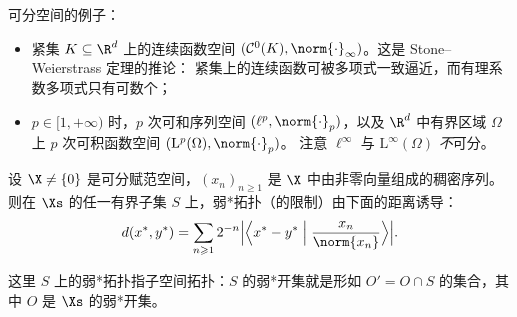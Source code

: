 \begin{example}
\label{exa:29}
可分空间的例子：
\begin{itemize}
  \item 紧集 $K\subseteq\R^d$ 上的连续函数空间 $(\mathcal{C}^0(K),\norm{\cdot}_\infty)$。这是 Stone--Weierstrass 定理的推论：
  紧集上的连续函数可被多项式一致逼近，而有理系数多项式只有可数个；
  \item $p\in[1,+\infty)$ 时，$p$ 次可和序列空间 $(\ell^p,\norm{\cdot}_p)$，以及 $\R^d$ 中有界区域 $\Omega$ 上 $p$ 次可积函数空间 $(\mathrm{L}^p(\Omega),\norm{\cdot}_p)$。
  注意 $\ell^\infty$ 与 $\mathrm{L}^\infty(\Omega)$ \emph{不}可分。
\end{itemize}
\end{example}

\begin{theorem}[对偶空间中有界集的可度量化]
\label{res:76}
设 $\X\neq\{0\}$ 是可分赋范空间，$(x_n)_{n\geqslant1}$ 是 $\X$ 中由非零向量组成的稠密序列。
则在 $\Xs$ 的任一有界子集 $S$ 上，弱*拓扑（的限制）由下面的距离诱导：
\[
  d(x^*,y^*)=\sum_{n\geqslant1}2^{-n}\Bigl|\Bigl\langle x^*-y^*\Bigm|\frac{x_n}{\norm{x_n}}\Bigr\rangle\Bigr| .
\]
\end{theorem}

\begin{remark}
\label{rem:32}
这里 $S$ 上的弱*拓扑指子空间拓扑：$S$ 的弱*开集就是形如 $O'=O\cap S$ 的集合，其中 $O$ 是 $\Xs$ 的弱*开集。
\end{remark}

